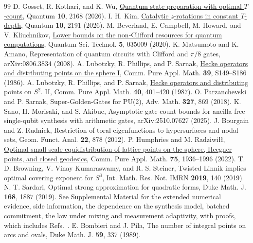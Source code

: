 \documentclass[aps,prx,twocolumn,superscriptaddress,nofootinbib,longbibliography]{revtex4-2}
\theoremstyle{plain}
\theoremstyle{definition}
\theoremstyle{remark}
\begin{document}
\begin{thebibliography}{99}
 D. Gosset, R. Kothari, and K. Wu, \href{https://doi.org/10.22331/q-2026-07-22-2168}{Quantum state preparation with optimal $T$-count}, Quantum \textbf{10}, 2168 (2026).
 I. H. Kim, \href{https://doi.org/10.22331/q-2026-08-13-2191}{Catalytic $z$-rotations in constant $T$-depth}, Quantum \textbf{10}, 2191 (2026).
 M. Beverland, E. Campbell, M. Howard, and V. Kliuchnikov, \href{https://doi.org/10.1088/2058-9565/ab8963}{Lower bounds on the non-Clifford resources for quantum computations}, Quantum Sci. Technol. \textbf{5}, 035009 (2020).
 K. Matsumoto and K. Amano, Representation of quantum circuits with Clifford and $\pi/8$ gates, arXiv:0806.3834 (2008).
 A. Lubotzky, R. Phillips, and P. Sarnak, \href{https://doi.org/10.1002/cpa.3160390710}{Hecke operators and distributing points on the sphere I}, Comm. Pure Appl. Math. \textbf{39}, S149--S186 (1986).
 A. Lubotzky, R. Phillips, and P. Sarnak, \href{https://doi.org/10.1002/cpa.3160400402}{Hecke operators and distributing points on $S^2$. II}, Comm. Pure Appl. Math. \textbf{40}, 401--420 (1987).
 O. Parzanchevski and P. Sarnak, Super-Golden-Gates for PU(2), Adv. Math. \textbf{327}, 869 (2018).
 K. Sano, H. Morisaki, and S. Akibue, Asymptotic gate count bounds for ancilla-free single-qubit synthesis with arithmetic gates, arXiv:2510.07627 (2025).
 J. Bourgain and Z. Rudnick, Restriction of toral eigenfunctions to hypersurfaces and nodal sets, Geom. Funct. Anal. \textbf{22}, 878 (2012).
 P. Humphries and M. Radziwi{\l}{\l}, \href{https://doi.org/10.1002/cpa.22076}{Optimal small scale equidistribution of lattice points on the sphere, Heegner points, and closed geodesics}, Comm. Pure Appl. Math. \textbf{75}, 1936--1996 (2022).
 T. D. Browning, V. Vinay Kumaraswamy, and R. S. Steiner, Twisted Linnik implies optimal covering exponent for $S^3$, Int. Math. Res. Not. IMRN \textbf{2019}, 140 (2019).
 N. T. Sardari, Optimal strong approximation for quadratic forms, Duke Math. J. \textbf{168}, 1887 (2019).
 See Supplemental Material for the extended numerical evidence, side information, the dependence on the synthesis model, batched commitment, the law under mixing and measurement adaptivity, with proofs, which includes Refs.~\cite{RennerWolf,TomamichelHayashi,Babbush,Sanders,Watrous}.
 E. Bombieri and J. Pila, The number of integral points on arcs and ovals, Duke Math. J. \textbf{59}, 337 (1989).

\end{thebibliography}
\end{document}
